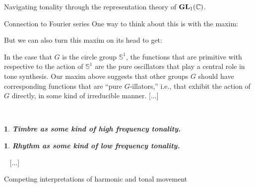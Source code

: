 \documentclass[letterpaper,11pt, reqno]{amsart}
\newtheorem{monodromy theorem}{Monodromy Theorem}[subsection]
\newtheorem{wild conjecture}[theorem]{Wild Conjecture}
\newtheorem{research objectives}{Research objectives}[subsection]
\newtheorem{research question}[theorem]{Research questions}
\newtheorem{aside question}[theorem]{Aside question}
\newtheorem{audio example}[theorem]{\loudspeaker[3] Example}
\newtheorem{blank remark}[theorem]{}
\newtheorem{ssubsection}[theorem]{}
\newtheorem{terminology and comment}[theorem]{Terminology and comment}
\newtheorem{purity hypothesis}[theorem]{Purity hypothesis}
\newtheorem{corollary of the purity hypothesis}[theorem]{Corollary of the purity hypothesis}
\newcommand{\CC} {{\mathbb C}}
\numberwithin{equation}{theorem}
\begin{document}
\begin{section}{Navigating tonality through the representation theory of $\bold{GL}_{1}(\CC)$.}
\begin{subsection}{Connection to Fourier series}
	One way to think about this is with the maxim:
But we can also turn this maxim on its head to get:
In the case that $G$ is the circle group $\mathbb{S}^{1}$, the functions that are primitive with respective to the action of $\mathbb{S}^{1}$ are the pure oscillators that play a central role in tone synthesis. Our maxim above suggests that other groups $G$ should have corresponding functions that are ``pure $G$-illators,'' i.e., that exhibit the action of $G$ directly, in some kind of irreducible manner.
{\color{red} [...]}

\ 	
\begin{ssubsection}
\normalfont
{\bf Timbre as some kind of high frequency tonality.}
\end{ssubsection}

\begin{ssubsection}
\normalfont
{\bf Rhythm as some kind of low frequency tonality.}
\end{ssubsection}

\ {\color{red} [...]}
\end{subsection}

\begin{subsection}{Competing interpretations of harmonic and tonal movement}\label{subsection: Competing interpretations of harmonic and tonal movement}


\end{subsection}
\end{section}
\end{document}
